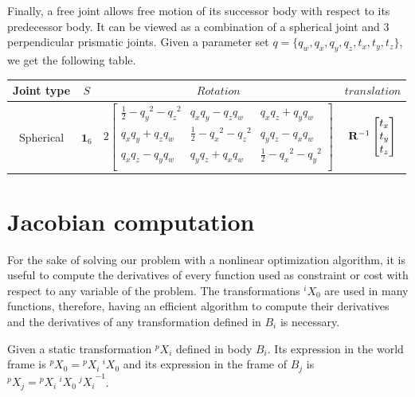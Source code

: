 Finally, a free joint allows free motion of its successor body with respect to its predecessor body.
It can be viewed as a combination of a spherical joint and 3 perpendicular prismatic joints.
Given a parameter set $q = \{ q_w, q_x, q_y, q_z, t_x, t_y, t_z\}$, we get the following table.

\begin{tabular}{cccc}
  \toprule
  Joint type & $S$ & $Rotation$ & $translation$ \\
  \midrule
  Spherical
  &
  $\mathbf{1}_6$
  &
  $2 \begin{bmatrix}
    \frac{1}{2} - {q_y}^2 - {q_z}^2 &	q_x q_y - q_z q_w &	q_x q_z + q_y q_w \\
    q_x q_y + q_z q_w	& \frac{1}{2} - {q_x}^2 - {q_z}^2 &	q_y q_z - q_x q_w \\
    q_x q_z - q_y q_w &	q_y q_z + q_x q_w	& \frac{1}{2} - {q_x}^2 - {q_y}^2 \\
  \end{bmatrix}$
  &
  ${\bf R}^{-1}\begin{bmatrix}
    t_x \\ t_y \\ t_z
  \end{bmatrix}$
  \\
  \bottomrule
\end{tabular}



\section{Jacobian computation}
\label{sec:jacobian_computation}


For the sake of solving our problem with a nonlinear optimization algorithm, it is useful to compute the derivatives of every function used as constraint or cost with respect to any variable of the problem.
The transformations ${}^i X_0$ are used in many functions, therefore, having an efficient algorithm to compute their derivatives and the derivatives of any transformation defined in $B_i$ is necessary.

Given a static transformation ${}^p X_i$ defined in body $B_i$.
Its expression in the world frame is ${}^p X_0 = {}^p X_i\ {}^i X_0$ and its expression in the frame of $B_j$ is ${}^p X_j = {}^p X_i\ {}^i X_0\ {{}^j X_i}^{-1}$.

